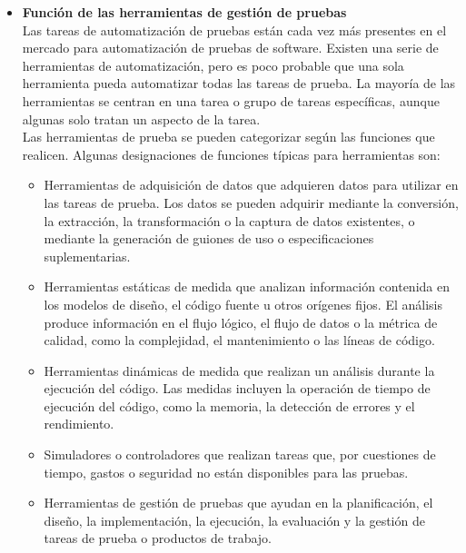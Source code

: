 \documentclass[12pt,a4paper,oneside]{book}
\begin{document}
\begin{enumerate}
\begin{itemize}
				\item \textbf{Función de las herramientas de gestión de pruebas}\\
				
					Las tareas de automatización de pruebas están cada vez más presentes en el mercado para automatización de pruebas de software. Existen una serie de herramientas de automatización, pero es poco probable que una sola herramienta pueda automatizar todas las tareas de prueba. La mayoría de las herramientas se centran en una tarea o grupo de tareas específicas, aunque algunas solo tratan un aspecto de la tarea.\\ 
					
					Las herramientas de prueba se pueden categorizar según las funciones que realicen. Algunas designaciones de funciones típicas para herramientas son:\\
					
						\begin{itemize}
							\item Herramientas de adquisición de datos que adquieren datos para utilizar en las tareas de prueba. Los datos se pueden adquirir mediante la conversión, la extracción, la transformación o la captura de datos existentes, o mediante la generación de guiones de uso o especificaciones suplementarias. \\
							\item Herramientas estáticas de medida que analizan información contenida en los modelos de diseño, el código fuente u otros orígenes fijos. El análisis produce información en el flujo lógico, el flujo de datos o la métrica de calidad, como la complejidad, el mantenimiento o las líneas de código.\\
							\item Herramientas dinámicas de medida que realizan un análisis durante la ejecución del código. Las medidas incluyen la operación de tiempo de ejecución del código, como la memoria, la detección de errores y el rendimiento. \\
							\item Simuladores o controladores que realizan tareas que, por cuestiones de tiempo, gastos o seguridad no están disponibles para las pruebas. \\
							\item Herramientas de gestión de pruebas que ayudan en la planificación, el diseño, la implementación, la ejecución, la evaluación y la gestión de tareas de prueba o productos de trabajo.\\
							

\end{itemize}
\end{itemize}
\end{enumerate}
\end{document}
